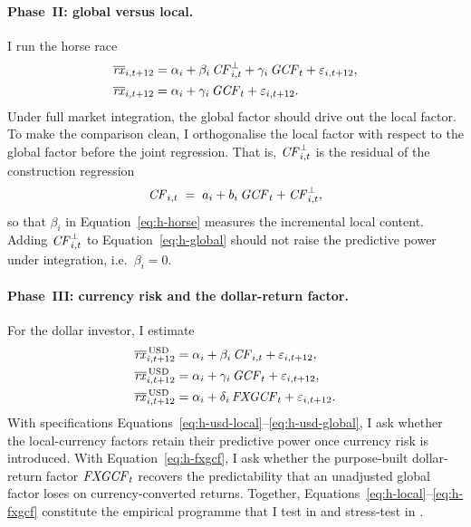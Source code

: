 \paragraph{Phase~II: global versus local.}
I run the horse race
\begin{align}
  \overline{\mathit{rx}}_{i,t+12} &= \alpha_{i} + \beta_{i}\,\mathit{CF}^{\perp}_{i,t}
                     + \gamma_{i}\,\mathit{GCF}_{t} + \varepsilon_{i,t+12},
                     \label{eq:h-horse}\\
  \overline{\mathit{rx}}_{i,t+12} &= \alpha_{i} + \gamma_{i}\,\mathit{GCF}_{t} + \varepsilon_{i,t+12}.
                     \label{eq:h-global}
\end{align}
Under full market integration, the global factor should drive out the local
factor. To make the comparison clean, I orthogonalise the local factor with
respect to the global factor before the joint regression. That is,
$\mathit{CF}^{\perp}_{i,t}$ is the residual of the construction regression
\begin{equation}
  \mathit{CF}_{i,t} \;=\; a_{i} + b_{i}\,\mathit{GCF}_{t} + \mathit{CF}^{\perp}_{i,t},
  \label{eq:cf-perp}
\end{equation}
so that $\beta_{i}$ in Equation~\eqref{eq:h-horse} measures the incremental local
content. Adding $\mathit{CF}^{\perp}_{i,t}$ to Equation~\eqref{eq:h-global} should not raise the
predictive power under integration, i.e.\ $\beta_{i}=0$.

\paragraph{Phase~III: currency risk and the dollar-return factor.}
For the dollar investor, I estimate
\begin{align}
  \overline{\mathit{rx}}^{\,\mathrm{USD}}_{i,t+12}
     &= \alpha_{i} + \beta_{i}\,\mathit{CF}_{i,t} + \varepsilon_{i,t+12},
        \label{eq:h-usd-local}\\
  \overline{\mathit{rx}}^{\,\mathrm{USD}}_{i,t+12}
     &= \alpha_{i} + \gamma_{i}\,\mathit{GCF}_{t} + \varepsilon_{i,t+12},
        \label{eq:h-usd-global}\\
  \overline{\mathit{rx}}^{\,\mathrm{USD}}_{i,t+12}
     &= \alpha_{i} + \delta_{i}\,\mathit{FXGCF}_{t} + \varepsilon_{i,t+12}.
        \label{eq:h-fxgcf}
\end{align}
With specifications Equations~\eqref{eq:h-usd-local}--\eqref{eq:h-usd-global}, I ask
whether the local-currency factors retain their predictive power once currency
risk is introduced. With Equation~\eqref{eq:h-fxgcf}, I ask whether the purpose-built
dollar-return factor $\mathit{FXGCF}_{t}$ recovers the predictability that an unadjusted
global factor loses on currency-converted returns. Together,
Equations~\eqref{eq:h-local}--\eqref{eq:h-fxgcf} constitute the empirical programme that
I test in  and stress-test in .

